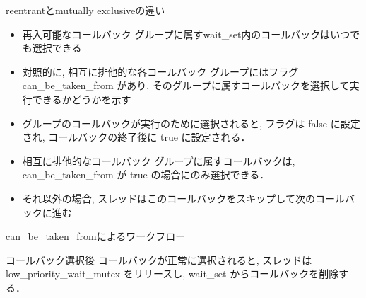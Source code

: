 \begin{frame}{reentrantとmutually exclusiveの違い}
    \begin{itemize}
        \item 再入可能なコールバック グループに属すwait\_set内のコールバックはいつでも選択できる
        \item 対照的に, 相互に排他的な各コールバック グループにはフラグ \alert{can\_be\_taken\_from} があり, そのグループに属すコールバックを選択して実行できるかどうかを示す
        \item グループのコールバックが実行のために選択されると, フラグは false に設定され, コールバックの終了後に true に設定される．
        \item 相互に排他的なコールバック グループに属すコールバックは,  can\_be\_taken\_from が true の場合にのみ選択できる．
        \item それ以外の場合, スレッドはこのコールバックをスキップして次のコールバックに進む
    \end{itemize}
\end{frame}

\begin{frame}{can\_be\_taken\_fromによるワークフロー}
    \centering
    \vspace{\headerheight}
\end{frame}

\begin{frame}{コールバック選択後}
    コールバックが正常に選択されると, スレッドは low\_priority\_wait\_mutex をリリースし, wait\_set からコールバックを削除する．

    \centering
\end{frame}

